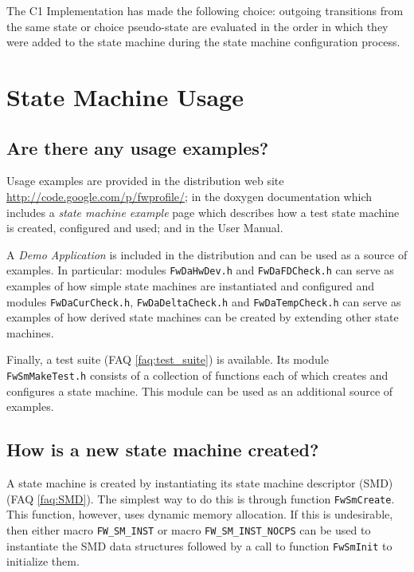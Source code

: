 \documentclass[faq]{../fwprofile}
\begin{document}
The C1 Implementation has made the following choice: outgoing transitions from the same state or choice pseudo-state are evaluated in the order in which 
they were added to the state machine during the state machine configuration process.

\section{State Machine Usage}

\subsection{Are there any usage examples?}
Usage examples are provided in the distribution web site
\url{http://code.google.com/p/fwprofile/}; in 
the doxygen documentation which includes a \emph{state machine example} page which describes how a test state machine is created, configured and used; and in the User Manual.

A \emph{Demo Application} is included in the distribution and can be used as a source of examples. In particular: modules 
\texttt{FwDaHwDev.h} and \texttt{FwDaFDCheck.h} can serve as examples of how simple state machines are instantiated and configured and modules 
\texttt{FwDaCurCheck.h}, \texttt{FwDaDeltaCheck.h} and \texttt{FwDaTempCheck.h} can serve as examples of how derived state machines can be created 
by extending other state machines.

Finally, a test suite (FAQ \ref{faq:test_suite}) is available. Its module \texttt{FwSmMakeTest.h} consists of a collection of functions each of 
which creates and configures a state machine. This module can be used as an additional source of examples.

\subsection{How is a new state machine created?}
A state machine is created by instantiating its state machine descriptor (SMD) (FAQ \ref{faq:SMD}). The simplest way to do this is through function \texttt{FwSmCreate}. 
This function, however, uses dynamic memory allocation. If this is undesirable, then either macro \texttt{FW\_SM\_INST} or
macro \texttt{FW\_SM\_INST\_NOCPS} can be used to instantiate 
the SMD data structures followed by a call to function \texttt{FwSmInit} to initialize them.
\end{document}
